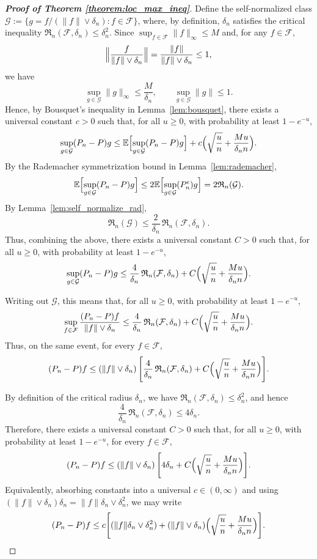 \documentclass[11pt]{article}
\theoremstyle{plain}
\theoremstyle{definition} %
\begin{document}
\begin{proof}[\textbf{Proof of Theorem \ref{theorem:loc_max_ineq}}]
Define the self-normalized class $\mathcal{G}:=\{g=f/(\|f\|\vee \delta_n): f\in\mathcal{F}\}$, where, by definition, $\delta_n$ satisfies the critical inequality $\mathfrak{R}_n(\mathcal{F},\delta_n)\le \delta_n^2$. Since $\sup_{f\in\mathcal{F}}\|f\|_\infty \le M$ and, for any $f\in\mathcal{F}$,
\[
\Bigl\|\frac{f}{\|f\|\vee \delta_n}\Bigr\|
=
\frac{\|f\|}{\|f\|\vee \delta_n}
\le 1,
\]
we have
\[
\sup_{g\in\mathcal{G}}\|g\|_\infty \le \frac{M}{\delta_n},
\qquad
\sup_{g\in\mathcal{G}}\|g\|\le 1.
\]
Hence, by Bousquet's inequality in Lemma~\ref{lem:bousquet}, there exists a universal constant $c>0$ such that, for all $u\ge 0$, with probability at least $1-e^{-u}$,
\[
\sup_{g\in\mathcal{G}} (P_n-P)g
\le
\mathbb{E}\Bigl[\sup_{g\in\mathcal{G}} (P_n-P)g\Bigr]
+
c\Bigl(
  \sqrt{\frac{u}{n}}
  + \frac{Mu}{\delta_n n}
\Bigr).
\]
By the Rademacher symmetrization bound in Lemma~\ref{lem:rademacher},
\[
\mathbb{E}\Bigl[\sup_{g\in\mathcal{G}} (P_n-P)g\Bigr]
\le
2\mathbb{E}\Bigl[\sup_{g\in\mathcal{G}} (P_n^\epsilon)g\Bigr]
=
2\mathfrak{R}_n(\mathcal{G}).
\]
By Lemma~\ref{lem:self_normalize_rad},
\[
\mathfrak{R}_n(\mathcal{G})
\le
\frac{2}{\delta_n}\,\mathfrak{R}_n(\mathcal{F},\delta_n).
\]
Thus, combining the above, there exists a universal constant $C>0$ such that, for all $u\ge 0$, with probability at least $1-e^{-u}$,
\[
\sup_{g\in\mathcal{G}} (P_n-P)g
\le
\frac{4}{\delta_n}\,\mathfrak{R}_n(\mathcal{F},\delta_n)
+
C\Bigl(
  \sqrt{\frac{u}{n}}
  + \frac{Mu}{\delta_n n}
\Bigr).
\]


Writing out $\mathcal{G}$, this means that, for all $u\ge 0$, with probability at least $1-e^{-u}$,
\[
\sup_{f\in\mathcal{F}}
\frac{(P_n-P)f}{\|f\|\vee \delta_n}
\le
\frac{4}{\delta_n}\,\mathfrak{R}_n(\mathcal{F},\delta_n)
+
C\Bigl(
  \sqrt{\frac{u}{n}}
  + \frac{Mu}{\delta_n n}
\Bigr).
\]
Thus, on the same event, for every $f\in\mathcal{F}$,
\[
(P_n-P)f
\le
(\|f\|\vee \delta_n)\,
\Biggl[
\frac{4}{\delta_n}\,\mathfrak{R}_n(\mathcal{F},\delta_n)
+
C\Bigl(
  \sqrt{\frac{u}{n}}
  + \frac{Mu}{\delta_n n}
\Bigr)
\Biggr].
\]

By definition of the critical radius $\delta_n$, we have $\mathfrak{R}_n(\mathcal{F},\delta_n)\le \delta_n^2$, and hence
\[
\frac{4}{\delta_n}\,\mathfrak{R}_n(\mathcal{F},\delta_n) \le 4\delta_n.
\]
Therefore, there exists a universal constant $C>0$ such that, for all $u\ge 0$, with probability at least $1-e^{-u}$, for every $f\in\mathcal{F}$,
\[
(P_n-P)f
\le
(\|f\|\vee \delta_n)\,
\Biggl[
4\delta_n
+
C\Bigl(
  \sqrt{\frac{u}{n}}
  + \frac{Mu}{\delta_n n}
\Bigr)
\Biggr].
\]
 Equivalently, absorbing constants into a universal $c\in(0,\infty)$ and using
$(\|f\|\vee\delta_n)\delta_n=\|f\|\delta_n \vee \delta_n^2$, we may write
\[
(P_n-P)f
\le
c\Biggl[
(\|f\|\delta_n \vee \delta_n^2)
+
(\|f\|\vee\delta_n)\Bigl(
  \sqrt{\frac{u}{n}}
  + \frac{Mu}{\delta_n n}
\Bigr)
\Biggr].
\]



\end{proof}
\end{document}
